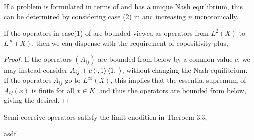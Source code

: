 \begin{corollary}
  If a problem is formulated in terms of  and has a unique Nash equilibrium, this can be determined by considering case (2) in  and increasing $n$ monotonically.
\end{corollary}
\begin{proposition}
  If the operators in case(1) of  are bounded viewed as operators from $L^2(X)$ to $L^\infty(X)$, then we can dispense with the requirement of copositivity plus,%
\end{proposition}
\begin{proof}
	If the operators $(A_{ij})$ are bounded from below by a common value $c$, we may instead consider $A_{ij} + c\left \langle \cdot,1 \right \rangle\left \langle 1,\cdot \right \rangle$, without changing the Nash equilibrium.
	If the operators $A_{ij}$ go to $L^\infty(X)$, this implies that the essential supremum of $A_{ij}(x)$ is finite for all $x \in K$, and thus the operators are bounded from below, giving the desired. 
\end{proof}

\begin{corollary}
	Semi-coercive operators satisfy the limit cnodition in Theroem 3.3,
\end{corollary}
\begin{example}
asdf
\end{example}





